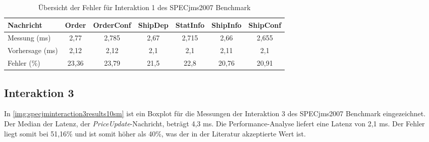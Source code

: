 
\begin{table}
  \begin{tabular}{|l|c|c|c|c|c|c|}
  \hline
    Nachricht & Order & OrderConf & ShipDep & StatInfo & ShipInfo & ShipConf \\
    \hline
    Messung (ms) & 2,77 & 2,785 & 2,67 & 2,715 & 2,66 & 2,655 \\\hline
    Vorhersage (ms) & 2,12 & 2,12 & 2,1 & 2,1 & 2,11 & 2,1 \\\hline
    Fehler (\%)& 23,36 & 23,79 & 21,5 & 22,8 & 20,76 & 20,91 \\\hline
  \end{tabular}
	\caption{\label{tab:interaction1error} Übersicht der Fehler für Interaktion 1 des SPECjms2007 Benchmark}
\end{table}

\subsection{Interaktion 3}
In \autoref{img:specjminteraction3results10sm} ist ein Boxplot für die Messungen der Interaktion 3 des SPECjms2007 Benchmark eingezeichnet. Der Median der Latenz, der \emph{PriceUpdate}-Nachricht, beträgt 4,3 ms. Die Performance-Analyse liefert eine Latenz von 2,1 ms. Der Fehler liegt somit bei 51,16\% und ist somit höher als 40\%, was der in der Literatur akzeptierte Wert ist.

